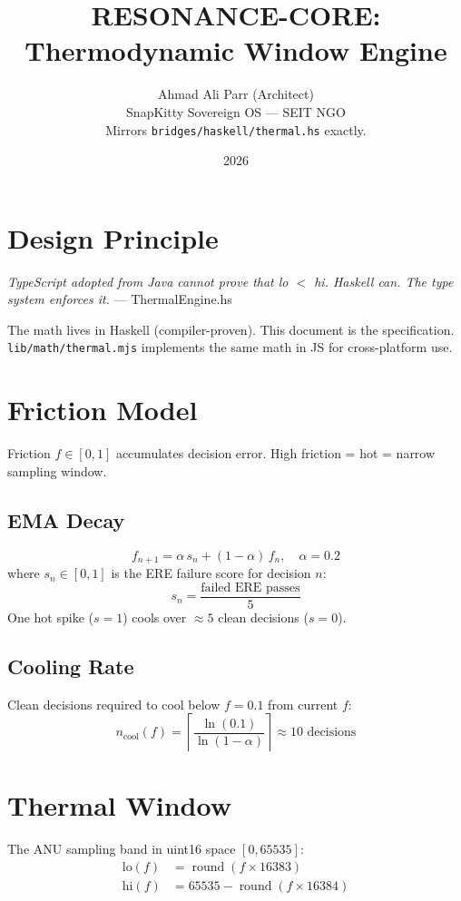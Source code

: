 \documentclass{article}
\title{RESONANCE-CORE: Thermodynamic Window Engine}
\author{Ahmad Ali Parr (Architect) \\ SnapKitty Sovereign OS --- SEIT NGO \\ \small{Mirrors \texttt{bridges/haskell/thermal.hs} exactly.}}
\date{2026}
\begin{document}
\maketitle

\section{Design Principle}
\textit{TypeScript adopted from Java cannot prove that lo $<$ hi. Haskell can. The type system enforces it.} --- ThermalEngine.hs

The math lives in Haskell (compiler-proven). This document is the specification. \texttt{lib/math/thermal.mjs} implements the same math in JS for cross-platform use.

\section{Friction Model}
Friction $f \in [0, 1]$ accumulates decision error. High friction = hot = narrow sampling window.

\subsection{EMA Decay}
\begin{equation}
  f_{n+1} = \alpha\, s_n + (1-\alpha)\, f_n, \quad \alpha = 0.2
\end{equation}
where $s_n \in [0,1]$ is the ERE failure score for decision $n$:
\[
  s_n = \frac{\text{failed ERE passes}}{5}
\]
One hot spike ($s=1$) cools over $\approx 5$ clean decisions ($s=0$).

\subsection{Cooling Rate}
Clean decisions required to cool below $f = 0.1$ from current $f$:
\begin{equation}
  n_{\text{cool}}(f) = \left\lceil \frac{\ln(0.1)}{\ln(1-\alpha)} \right\rceil \approx 10 \text{ decisions}
\end{equation}

\section{Thermal Window}
The ANU sampling band in uint16 space $[0, 65535]$:
\begin{align}
  \mathrm{lo}(f) &= \operatorname{round}(f \times 16383) \\
  \mathrm{hi}(f) &= 65535 - \operatorname{round}(f \times 16384)
\end{align}
\end{document}
